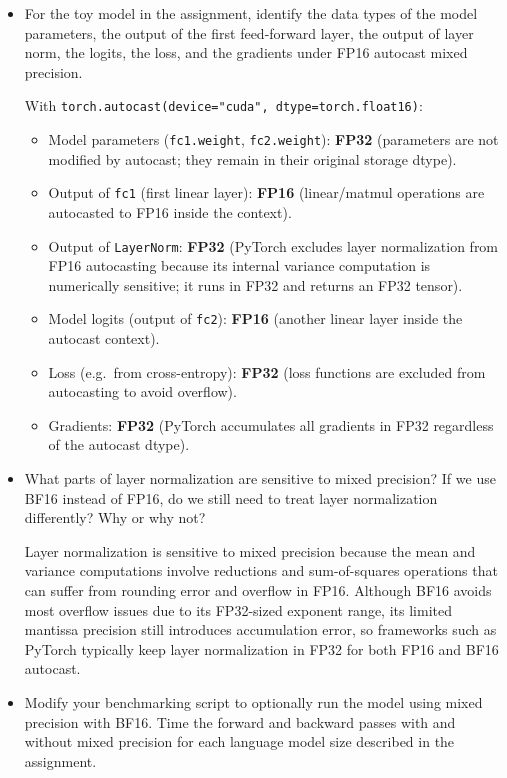 \documentclass[letterpaper]{article}
\begin{document}
	\begin{itemize}
		\item[(a)] For the toy model in the assignment, identify the data types of the model parameters, the output of the first feed-forward layer, the output of layer norm, the logits, the loss, and the gradients under FP16 autocast mixed precision.
		
		With \texttt{torch.autocast(device="cuda", dtype=torch.float16)}:
		\begin{itemize}
			\item Model parameters (\texttt{fc1.weight}, \texttt{fc2.weight}): \textbf{FP32} (parameters are not modified by autocast; they remain in their original storage dtype).
			\item Output of \texttt{fc1} (first linear layer): \textbf{FP16} (linear/matmul operations are autocasted to FP16 inside the context).
			\item Output of \texttt{LayerNorm}: \textbf{FP32} (PyTorch excludes layer normalization from FP16 autocasting because its internal variance computation is numerically sensitive; it runs in FP32 and returns an FP32 tensor).
			\item Model logits (output of \texttt{fc2}): \textbf{FP16} (another linear layer inside the autocast context).
			\item Loss (e.g.\ from cross-entropy): \textbf{FP32} (loss functions are excluded from autocasting to avoid overflow).
			\item Gradients: \textbf{FP32} (PyTorch accumulates all gradients in FP32 regardless of the autocast dtype).
		\end{itemize}
		
		\item[(b)] What parts of layer normalization are sensitive to mixed precision? If we use BF16 instead of FP16, do we still need to treat layer normalization differently? Why or why not?
		
		Layer normalization is sensitive to mixed precision because the mean and variance computations involve reductions and sum-of-squares operations that can suffer from rounding error and overflow in FP16. Although BF16 avoids most overflow issues due to its FP32-sized exponent range, its limited mantissa precision still introduces accumulation error, so frameworks such as PyTorch typically keep layer normalization in FP32 for both FP16 and BF16 autocast.
		
		\item[(c)] Modify your benchmarking script to optionally run the model using mixed precision with BF16. Time the forward and backward passes with and without mixed precision for each language model size described in the assignment.
		

\end{itemize}
\end{document}
